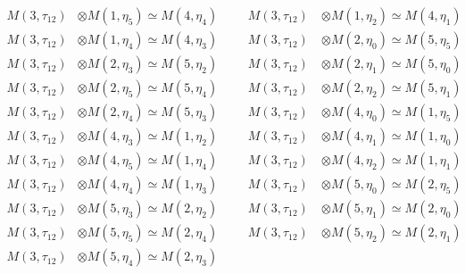 \begin{align*}
M(3,\tau_{12}) &\otimes M(1,\eta_{5}) \simeq M(4,\eta_{4}) &&& M(3,\tau_{12}) \
&\otimes M(1,\eta_{2}) \simeq M(4,\eta_{1})\\
M(3,\tau_{12}) &\otimes M(1,\eta_{4}) \simeq M(4,\eta_{3}) &&& M(3,\tau_{12}) \
&\otimes M(2,\eta_{0}) \simeq M(5,\eta_{5})\\
M(3,\tau_{12}) &\otimes M(2,\eta_{3}) \simeq M(5,\eta_{2}) &&& M(3,\tau_{12}) \
&\otimes M(2,\eta_{1}) \simeq M(5,\eta_{0})\\
M(3,\tau_{12}) &\otimes M(2,\eta_{5}) \simeq M(5,\eta_{4}) &&& M(3,\tau_{12}) \
&\otimes M(2,\eta_{2}) \simeq M(5,\eta_{1})\\
M(3,\tau_{12}) &\otimes M(2,\eta_{4}) \simeq M(5,\eta_{3}) &&& M(3,\tau_{12}) \
&\otimes M(4,\eta_{0}) \simeq M(1,\eta_{5})\\
M(3,\tau_{12}) &\otimes M(4,\eta_{3}) \simeq M(1,\eta_{2}) &&& M(3,\tau_{12}) \
&\otimes M(4,\eta_{1}) \simeq M(1,\eta_{0})\\
M(3,\tau_{12}) &\otimes M(4,\eta_{5}) \simeq M(1,\eta_{4}) &&& M(3,\tau_{12}) \
&\otimes M(4,\eta_{2}) \simeq M(1,\eta_{1})\\
M(3,\tau_{12}) &\otimes M(4,\eta_{4}) \simeq M(1,\eta_{3}) &&& M(3,\tau_{12}) \
&\otimes M(5,\eta_{0}) \simeq M(2,\eta_{5})\\
M(3,\tau_{12}) &\otimes M(5,\eta_{3}) \simeq M(2,\eta_{2}) &&& M(3,\tau_{12}) \
&\otimes M(5,\eta_{1}) \simeq M(2,\eta_{0})\\
M(3,\tau_{12}) &\otimes M(5,\eta_{5}) \simeq M(2,\eta_{4}) &&& M(3,\tau_{12}) \
&\otimes M(5,\eta_{2}) \simeq M(2,\eta_{1})\\
M(3,\tau_{12}) &\otimes M(5,\eta_{4}) \simeq M(2,\eta_{3})\\
\end{align*}

